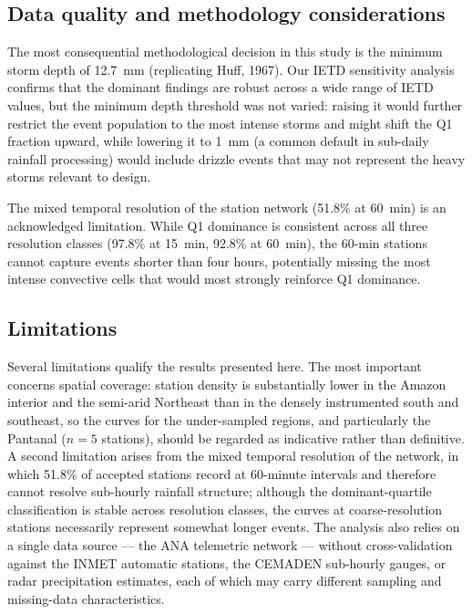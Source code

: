 \documentclass[a4paper,fleqn]{cas-sc}
\begin{document}
\subsection{Data quality and methodology considerations}

The most consequential methodological decision in this study is the
minimum storm depth of 12.7~mm (replicating Huff, 1967). Our IETD
sensitivity analysis confirms that the dominant findings are robust
across a wide range of IETD values, but the minimum depth threshold
was not varied: raising it would further restrict the event population
to the most intense storms and might shift the Q1 fraction upward, while
lowering it to 1~mm (a common default in sub-daily rainfall processing)
would include drizzle events that may not represent the heavy storms
relevant to design.

The mixed temporal resolution of the station network (51.8\% at
60~min) is an acknowledged limitation. While Q1 dominance is
consistent across all three resolution classes (97.8\% at 15~min,
92.8\% at 60~min), the 60-min stations cannot capture events shorter
than four hours, potentially missing the most intense convective cells
that would most strongly reinforce Q1 dominance.

\subsection{Limitations}
\label{sec:limitations}

Several limitations qualify the results presented here. The most
important concerns spatial coverage: station density is substantially
lower in the Amazon interior and the semi-arid Northeast than in the
densely instrumented south and southeast, so the curves for the
under-sampled regions, and particularly the Pantanal ($n = 5$
stations), should be regarded as indicative rather than definitive.
A second limitation arises from the mixed temporal resolution of the
network, in which 51.8\% of accepted stations record at 60-minute
intervals and therefore cannot resolve sub-hourly rainfall structure;
although the dominant-quartile classification is stable across
resolution classes, the curves at coarse-resolution stations
necessarily represent somewhat longer events. The analysis also
relies on a single data source — the ANA telemetric network — without
cross-validation against the INMET automatic stations, the CEMADEN
sub-hourly gauges, or radar precipitation estimates, each of which may
carry different sampling and missing-data characteristics.
\end{document}
